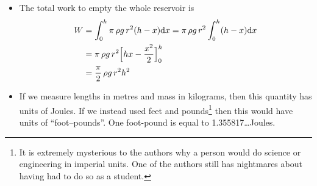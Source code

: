 \begin{eg}
\begin{itemize}
\item The total work to empty the whole reservoir is
\begin{align*}
W&= \int_0^h \pi\,\rho g\,r^2 (h-x)\mathrm{d}x
= \pi\,\rho g\,r^2 \int_0^h  (h-x)\mathrm{d}x \\
&=\pi\,\rho g\,r^2  \Big[hx -\frac{x^2}{2}\Big]_0^h \\
&=\frac{\pi}{2}\,\rho g\, r^2 h^2
\end{align*}
\item If we measure lengths in metres and mass in kilograms, then this
quantity has units of Joules. If we instead used feet and pounds\footnote{%
It is extremely mysterious to the authors why a person would do science
or engineering in imperial units. One of the authors still has nightmares
about having had to do so as a student.} then this would
have units of ``foot--pounds''. One foot-pound is equal to
1.355817\dots Joules.
\end{itemize}

\end{eg}




